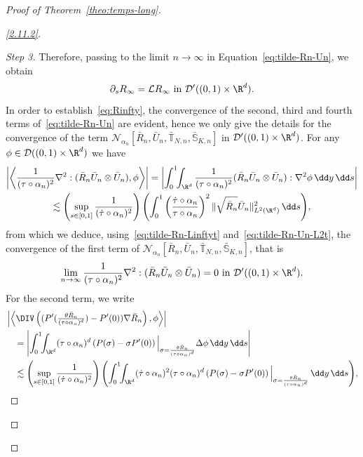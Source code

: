 \begin{proof}[Proof of Theorem~\ref{theo:temps-long}]
\begin{proof}[\eqref{2.11.2}]
\begin{proof}[Step 3]
Therefore, passing to the limit $n \to \infty$ in Equation~\eqref{eq:tilde-Rn-Un}, we obtain
\begin{equation}\label{eq:Rinfty}
\partial_s R_\infty = \mathcal L R_\infty \text{ in } \mathcal D' ((0,1) \times \R^d).
\end{equation}
In order to establish~\eqref{eq:Rinfty}, the convergence of the second, third and fourth terms of~\eqref{eq:tilde-Rn-Un} are evident, hence we only give the details for the convergence of the term $\mathcal N_{\alpha_n} [\bar R_n,\bar U_n, \bar{\mathbb T}_{N,n}, \bar{\mathbb S}_{K,n}] $ in $\mathcal D' ((0,1) \times \R^d)$. For any $\phi \in \mathcal D ((0,1) \times \R^d)$ we have
\begin{multline*}
\left| \left\langle \frac{1}{(\tau\circ\alpha_n)^2} \nabla^2 : (\bar R_n \bar U_n \otimes \bar U_n), \phi \right\rangle \right| = \left|
\int_0^1 \!\! \int_{\R^d}
\frac{1}{(\tau\circ\alpha_n)^2} (\bar R_n \bar U_n \otimes \bar U_n) : \nabla^2 \phi \, \dd y \, \dd s \right| \\
\lesssim \left(\sup_{s \in [0,1]} \frac{1}{(\dot \tau
\circ\alpha_n)^2} \right)
\left(\int_0^1 \left(\frac{\dot
\tau\circ\alpha_n}{\tau\circ\alpha_n} \right)^2 \| \sqrt{\bar R_n} \bar U_n \|_{L^2(\R^d)}^2 \, \dd s \right)\!,
\end{multline*}
from which we deduce, using~\eqref{eq:tilde-Rn-Linftyt} and~\eqref{eq:tilde-Rn-Un-L2t}, the convergence of the first term of $\mathcal N_{\alpha_n}[\bar R_n,\bar U_n, \bar{\mathbb T}_{N,n}, \bar{\mathbb S}_{K,n}] $, that is
\[
\lim_{n \to \infty} \frac{1}{(\tau\circ\alpha_n)^2} \nabla^2 : (\bar R_n \bar U_n \otimes \bar U_n) = 0
\text{ in } \mathcal D'((0,1) \times \R^d).
\]
For the second term, we write
\[
\begin{aligned}
&
\left| \left\langle
\DIV \left((P'(\tfrac{\theta\bar R_n}{(\tau \circ \alpha_n)^d}) - P'(0))
\nabla \bar R_n \right), \phi \right\rangle \right| \\
&\quad = \left|
\int_0^1 \!\! \int_{\R^d} (\tau\circ \alpha_n)^d \left(P(\sigma) - \sigma P'(0) \right)\Big|_{\sigma =
\frac{\theta\bar R_n}{(\tau \circ \alpha_n)^d} } \Delta \phi \, \dd y \,
\dd s \right| \\
&\quad
\lesssim \left(\sup_{s \in [0,1]} \frac{1}{(\dot \tau \circ
\alpha_n)^2} \right)\left(\int_0^1 \!\! \int_{\R^d} (\dot \tau \circ \alpha_n)^2 (\tau\circ \alpha_n)^d \left(P(\sigma) -
\sigma P'(0) \right)\Big|_{\sigma = \frac{\theta \bar R_n}{(\tau \circ
\alpha_n)^d} } \, \dd y \, \dd s \right)\!,
\end{aligned}
\]
\end{proof}
\end{proof}
\end{proof}

